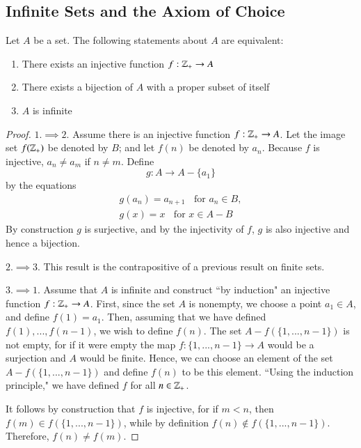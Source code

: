 \documentclass[12pt, a4paper, oneside, openright, titlepage]{book}
\begin{document}
\begin{appendices}
    \section{Infinite Sets and the Axiom of Choice}


    \begin{thm}\label{thm:infequivs}
        Let $A$ be a set. The following statements about $A$ are equivalent:\begin{enumerate}
            \item There exists an injective function $f:\mathbb Z_+\rightarrow A$
            \item There exists a bijection of $A$ with a proper subset of itself
            \item $A$ is infinite
        \end{enumerate}
    \end{thm}
    \begin{proof}
        $1.\implies 2.$ Assume there is an injective function $f:\mathbb Z_+\rightarrow A$. Let the image set $f(\mathbb Z_+)$ be denoted by $B$; and let $f(n)$ be denoted by $a_n$. Because $f$ is injective, $a_n\neq a_m$ if $n \neq m$. Define \begin{equation*}
            g:A\rightarrow A-\{a_1\}
        \end{equation*}
        by the equations \begin{align*}
            g(a_n) = a_{n+1}\;\;\text{ for }a_n \in B, \\
            g(x) = x\;\;\text{ for } x \in A-B
        \end{align*}
        By construction $g$ is surjective, and by the injectivity of $f$, $g$ is also injective and hence a bijection.

        $2.\implies 3.$ This result is the contrapositive of a previous result on finite sets.


        $3.\implies 1.$ Assume that $A$ is infinite and construct ``by induction" an injective function $f:\mathbb Z_+\rightarrow A$. First, since the set $A$ is nonempty, we choose a point $a_1 \in A$, and define $f(1) = a_1$. Then, assuming that we have defined $f(1),...,f(n-1)$, we wish to define $f(n)$. The set $A-f(\{1,...,n-1\})$ is not empty, for if it were empty the map $f:\{1,...,n-1\}\rightarrow A$ would be a surjection and $A$ would be finite. Hence, we can choose an element of the set $A-f(\{1,...,n-1\})$ and define $f(n)$ to be this element. ``Using the induction principle," we have defined $f$ for all $n \in \mathbb Z_+$.

        It follows by construction that $f$ is injective, for if $m < n$, then $f(m) \in f(\{1,...,n-1\})$, while by definition $f(n) \notin f(\{1,...,n-1\})$. Therefore, $f(n) \neq f(m)$.
    \end{proof}


\end{appendices}
\end{document}
